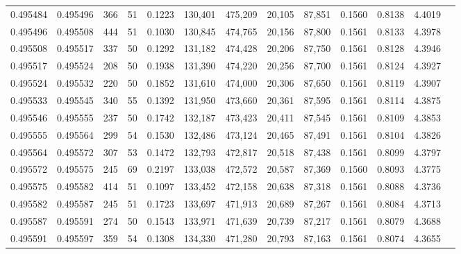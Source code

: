 \begin{tabular}{rrrrrrrrrrrrr}
0.495484 & 0.495496 & 366 &  51 &                                     0.1223 & 130,401 & 475,209 &  20,105 &  87,851 & 0.1560 & 0.8138 & 4.4019 \\
0.495496 & 0.495508 & 444 &  51 &                                     0.1030 & 130,845 & 474,765 &  20,156 &  87,800 & 0.1561 & 0.8133 & 4.3978 \\
0.495508 & 0.495517 & 337 &  50 &                                     0.1292 & 131,182 & 474,428 &  20,206 &  87,750 & 0.1561 & 0.8128 & 4.3946 \\
0.495517 & 0.495524 & 208 &  50 &                                     0.1938 & 131,390 & 474,220 &  20,256 &  87,700 & 0.1561 & 0.8124 & 4.3927 \\
0.495524 & 0.495532 & 220 &  50 &                                     0.1852 & 131,610 & 474,000 &  20,306 &  87,650 & 0.1561 & 0.8119 & 4.3907 \\
0.495533 & 0.495545 & 340 &  55 &                                     0.1392 & 131,950 & 473,660 &  20,361 &  87,595 & 0.1561 & 0.8114 & 4.3875 \\
0.495546 & 0.495555 & 237 &  50 &                                     0.1742 & 132,187 & 473,423 &  20,411 &  87,545 & 0.1561 & 0.8109 & 4.3853 \\
0.495555 & 0.495564 & 299 &  54 &                                     0.1530 & 132,486 & 473,124 &  20,465 &  87,491 & 0.1561 & 0.8104 & 4.3826 \\
0.495564 & 0.495572 & 307 &  53 &                                     0.1472 & 132,793 & 472,817 &  20,518 &  87,438 & 0.1561 & 0.8099 & 4.3797 \\
0.495572 & 0.495575 & 245 &  69 &                                     0.2197 & 133,038 & 472,572 &  20,587 &  87,369 & 0.1560 & 0.8093 & 4.3775 \\
0.495575 & 0.495582 & 414 &  51 &                                     0.1097 & 133,452 & 472,158 &  20,638 &  87,318 & 0.1561 & 0.8088 & 4.3736 \\
0.495582 & 0.495587 & 245 &  51 &                                     0.1723 & 133,697 & 471,913 &  20,689 &  87,267 & 0.1561 & 0.8084 & 4.3713 \\
0.495587 & 0.495591 & 274 &  50 &                                     0.1543 & 133,971 & 471,639 &  20,739 &  87,217 & 0.1561 & 0.8079 & 4.3688 \\
0.495591 & 0.495597 & 359 &  54 &                                     0.1308 & 134,330 & 471,280 &  20,793 &  87,163 & 0.1561 & 0.8074 & 4.3655 \\

\end{tabular}
